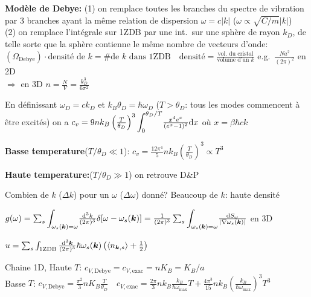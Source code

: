 \begin{squishlist}
    \item \textbf{Modèle de Debye:} (1) on remplace toutes les branches du spectre de vibration par 3 branches ayant la même relation de dispersion $\omega = c|k|$ ($\omega \propto \sqrt{C/m}|k|$) \\
    (2) on remplace l'intégrale sur 1ZDB par une int.\ sur une sphère de rayon $k_D$, de telle sorte que la sphère contienne le même nombre de vecteurs d'onde: \\
    $\left( \Omega_{\text{Debye}} \right) \cdot \text{densité de }k = \# \text{de } k \text{ dans 1ZDB}\quad \text{densité}=\frac{\text{vol.\ du cristal}}{\text{volume d'un }k}$ e.g.\ $\frac{N a^2}{(2\pi)^2}$ en 2D \\
    $\Longrightarrow$ en 3D $n = \frac{N}{V} = \frac{k_D^3}{6\pi^2}$
    \item En définissant $\omega_D = ck_D$ et $k_B \theta_D = \hbar \omega_D$ ($T > \theta_D$: tous les modes commencent à être excités) on a
    $c_v = 9 n k_B \left(\frac{T}{\theta_D}\right)^3 {\displaystyle \int_0^{\theta_D/T}} \frac{x^4 e^x}{(e^x - 1)^2} \textrm{d} x$ où $x = \beta \hbar c k$
    \item \textbf{Basse temperature}($T/\theta_D \ll 1$): $c_v = \frac{12\pi^4}{5} n k_B \left( \frac{T}{\theta_D}\right)^3 \propto T^3$
    \item \textbf{Haute temperature:}($T/\theta_D \gg 1$) on retrouve D\&P
\end{squishlist}

Combien de $k$ ($\Delta k$) pour un $\omega$ ($\Delta \omega$) donné? Beaucoup de $k$: haute densité
\begin{squishlist}
    \item $g(\omega) = \sum_s {\displaystyle \int_{\omega_s(\bm{k}) = \omega}} \frac{\textrm{d}^3 k}{(2\pi)^3}\delta[\omega - \omega_s(\bm{k})] = \frac{1}{(2\pi)^3} \sum_s {\displaystyle \int_{\omega_s(\bm{k}) = \omega}} \frac{\textrm{d} S_{\omega}}{|\nabla \omega_s(\bm{k})|}$ en 3D
    \item $u = \sum_s \int_{\text{1ZDB}} \frac{\textrm{d}^3 \bm{k}}{(2\pi)^3} \hbar \omega_s(\bm{k}) \left(\braket{n_{\bm{k}, s}} + \frac{1}{2}\right)$
    \item Chaine 1D, Haute $T$: $c_{V, \text{Debye}} = c_{V,\text{exac}} = n K_B = K_B / a$ \\
    Basse $T$: $c_{V, \text{Debye}} = \frac{\pi^2}{3}nK_B \frac{T}{\theta_D} \quad c_{V,\text{exac}} = \frac{2\pi}{3} n k_B \frac{k_B}{\hbar \omega_{\max}} T + \frac{4 \pi^3}{15} nk_B \left(\frac{k_B}{\hbar \omega_{\max}}\right)^3 T^3$
\end{squishlist}

